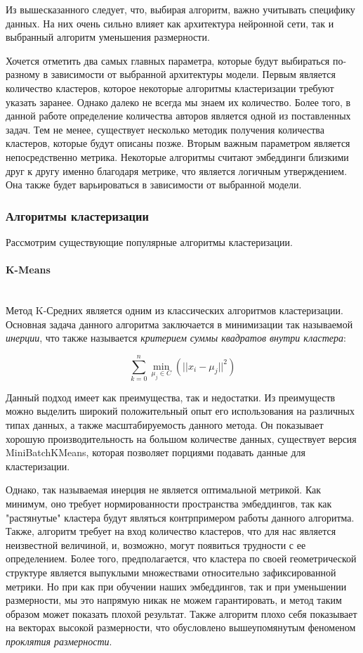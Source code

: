 Из вышесказанного следует, что, выбирая алгоритм, важно учитывать специфику данных. На них очень сильно влияет как архитектура нейронной сети, так и выбранный алгоритм уменьшения размерности. 

Хочется отметить два самых главных параметра, которые будут выбираться по-разному в зависимости от выбранной архитектуры модели. Первым является количество кластеров, которое некоторые алгоритмы кластеризации требуют указать заранее. Однако далеко не всегда мы знаем их количество. Более того, в данной работе определение количества авторов является одной из поставленных задач. Тем не менее, существует несколько методик получения количества кластеров, которые будут описаны позже. Вторым важным параметром является непосредственно метрика. Некоторые алгоритмы считают эмбеддинги близкими друг к другу именно благодаря метрике, что является логичным утверждением. Она также будет варьироваться в зависимости от выбранной модели.

\subsubsection{Алгоритмы кластеризации}

Рассмотрим существующие популярные алгоритмы кластеризации.

\paragraph{K-Means}\mbox{} \\

Метод K-Средних является одним из классических алгоритмов кластеризации. Основная задача данного алгоритма заключается в минимизации так называемой \textit{инерции}, что также называется \textit{критерием суммы квадратов внутри кластера}:

$$
\sum_{k=0}^{n} \min_{\mu_j \in C}(||x_i - \mu_j||^2)
$$

\bigskip
\noindent
Данный подход имеет как преимущества, так и недостатки. Из преимуществ можно выделить широкий положительный опыт его использования на различных типах данных, а также масштабируемость данного метода. Он показывает хорошую производительность на большом количестве данных, существует версия MiniBatchKMeans, которая позволяет порциями подавать данные для кластеризации.

Однако, так называемая инерция не является оптимальной метрикой. Как минимум, оно требует нормированности пространства эмбеддингов, так как "растянутые" кластера будут являться контрпримером работы данного алгоритма. Также, алгоритм требует на вход количество кластеров, что для нас является неизвестной величиной, и, возможно, могут появиться трудности с ее определением. Более того, предполагается, что кластера по своей геометрической структуре является выпуклыми множествами относительно зафиксированной метрики. Но при как при обучении наших эмбеддингов, так и при уменьшении размерности, мы это напрямую никак не можем гарантировать, и метод таким образом может показать плохой результат. Также алгоритм плохо себя показывает на векторах высокой размерности, что обусловлено вышеупомянутым феноменом \textit{проклятия размерности}.

